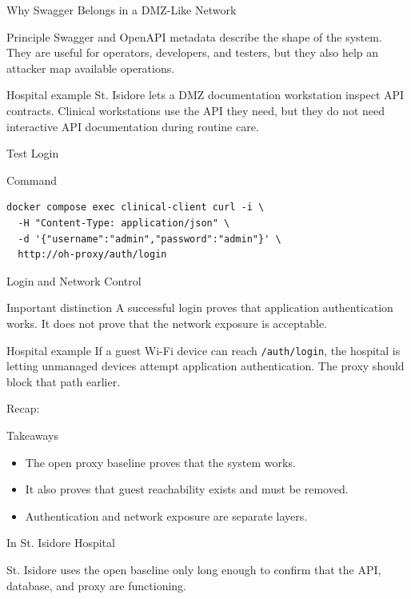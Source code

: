 \documentclass[presentation]{beamer}
\newcommand{\scenario}{St. Isidore Hospital}
\newcommand{\takeawaysframe}[2]{
\begin{frame}[c]{Recap: \insertsection}
\begin{block}{Takeaways}
#1
\end{block}
\begin{exampleblock}{In \scenario}
#2
\end{exampleblock}
\end{frame}
}
\begin{document}
\begin{frame}[c]{Why Swagger Belongs in a DMZ-Like Network}
\begin{block}{Principle}
Swagger and OpenAPI metadata describe the shape of the system. They are useful for operators,
developers, and testers, but they also help an attacker map available operations.
\end{block}

\begin{exampleblock}{Hospital example}
St. Isidore lets a DMZ documentation workstation inspect API contracts. Clinical workstations use
the API they need, but they do not need interactive API documentation during routine care.
\end{exampleblock}
\end{frame}

\begin{frame}[fragile,c]{Test Login}
\begin{block}{Command}
\begin{verbatim}
docker compose exec clinical-client curl -i \
  -H "Content-Type: application/json" \
  -d '{"username":"admin","password":"admin"}' \
  http://oh-proxy/auth/login
\end{verbatim}
\end{block}
\end{frame}

\begin{frame}[c]{Login and Network Control}
\begin{block}{Important distinction}
A successful login proves that application authentication works. It does not prove that the network
exposure is acceptable.
\end{block}

\begin{exampleblock}{Hospital example}
If a guest Wi-Fi device can reach \texttt{/auth/login}, the hospital is letting unmanaged devices
attempt application authentication. The proxy should block that path earlier.
\end{exampleblock}
\end{frame}

\takeawaysframe{
\begin{itemize}
    \item The open proxy baseline proves that the system works.
    \item It also proves that guest reachability exists and must be removed.
    \item Authentication and network exposure are separate layers.
\end{itemize}
}{
St. Isidore uses the open baseline only long enough to confirm that the API, database, and proxy are
functioning.
}
\end{document}
